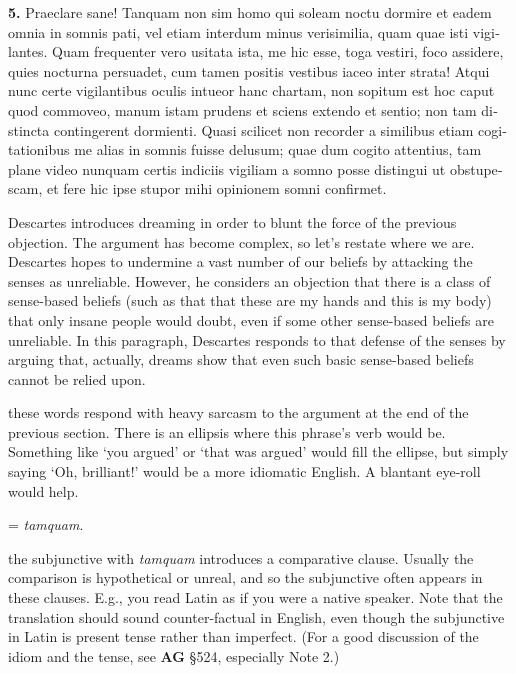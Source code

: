 \beginnumbering
\pstart
\begin{latin}
\textenglish{\textbf{5.}} Praeclare sane! Tanquam non sim homo qui soleam noctu dormire et eadem omnia in somnis pati, vel etiam interdum minus verisimilia, quam quae isti vigilantes. Quam frequenter vero usitata ista, me hic esse, toga vestiri, foco assidere, quies nocturna persuadet, cum tamen positis vestibus iaceo inter strata! Atqui nunc certe vigilantibus oculis intueor hanc chartam, non sopitum est hoc caput quod commoveo, manum istam prudens et sciens extendo et sentio; non tam distincta contingerent dormienti. Quasi scilicet non recorder a similibus etiam cogitationibus me alias in somnis fuisse delusum; quae dum cogito attentius, tam plane video nunquam certis indiciis vigiliam a somno posse distingui ut obstupescam, et fere hic ipse stupor mihi opinionem somni confirmet.
\end{latin}
\pend
\endnumbering

\prenotes

Descartes introduces dreaming in order to blunt the force of the previous objection. The argument has become complex, so let's restate where we are. Descartes hopes to undermine a vast number of our beliefs by attacking the senses as unreliable. However, he considers an objection that there is a class of sense-based beliefs (such as that that these are my hands and this is my body) that only insane people would doubt, even if some other sense-based beliefs are unreliable. In this paragraph, Descartes responds to that defense of the senses by arguing that, actually, dreams show that even such basic sense-based beliefs cannot be relied upon.

 these words respond with heavy sarcasm to the argument at the end of the previous section. There is an ellipsis where this phrase's verb would be. Something like `you argued' or `that was argued' would fill the ellipse, but simply saying `Oh, brilliant!' would be a more idiomatic English. A blantant eye-roll would help.

 = \textit{tamquam}.

 the subjunctive with \textit{tamquam} introduces a comparative clause. Usually the comparison is hypothetical or unreal, and so the subjunctive often appears in these clauses. E.g., you read Latin as if you were a native speaker. Note that the translation should sound counter-factual in English, even though the subjunctive in Latin is present tense rather than imperfect. (For a good discussion of the idiom and the tense, see \textbf{AG} §524, especially Note 2.)

